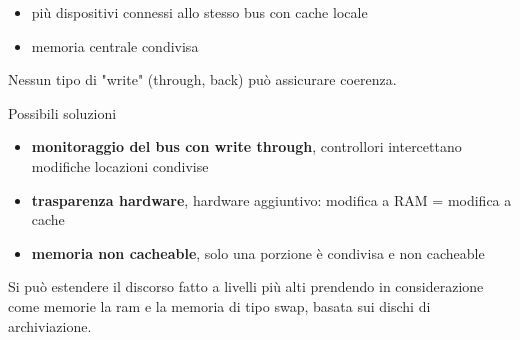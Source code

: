 \documentclass[12pt, a4paper]{article}
\begin{document}
\begin{esem}
\begin{itemize}
	\item più dispositivi connessi allo stesso bus con cache locale
	\item memoria centrale condivisa
\end{itemize}
Nessun tipo di "write" (through, back) può assicurare coerenza.
\end{esem}
Possibili soluzioni
\begin{itemize}
	\item \textbf{monitoraggio del bus con write through}, controllori intercettano modifiche locazioni condivise
	\item \textbf{trasparenza hardware}, hardware aggiuntivo: modifica a RAM = modifica a cache
	\item \textbf{memoria non cacheable}, solo una porzione è condivisa e non cacheable
\end{itemize}
Si può estendere il discorso fatto a livelli più alti prendendo in considerazione come memorie la ram e la memoria di tipo swap, basata sui dischi di archiviazione. 
\end{document}
